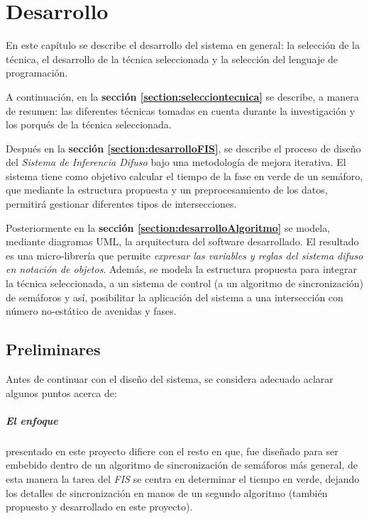 \chapter{Desarrollo}

En este capítulo se describe el desarrollo del sistema en general: la selección de la técnica, el desarrollo de la técnica seleccionada y la selección del lenguaje de programación.

A continuación, en la \textbf{sección \ref{section:selecciontecnica}} se describe, a manera de resumen: las diferentes técnicas tomadas en cuenta durante la investigación y los porqués de la técnica seleccionada.

Después en la \textbf{sección \ref{section:desarrolloFIS}}, se describe el proceso de diseño del \textit{Sistema de Inferencia Difuso} bajo una metodología de mejora iterativa. El sistema tiene como objetivo calcular el tiempo de la fase en verde de un semáforo, que mediante la estructura propuesta y un preprocesamiento de los datos, permitirá gestionar diferentes tipos de intersecciones.

Posteriormente en la \textbf{sección \ref{section:desarrolloAlgoritmo}} se modela, mediante diagramas UML, la arquitectura del software desarrollado. El resultado es una micro-librería que permite \emph{expresar las variables y reglas del sistema difuso en notación de objetos}. Además, se modela la estructura propuesta para integrar la técnica seleccionada, a un sistema de control (a un algoritmo de sincronización) de semáforos y así, posibilitar la aplicación del sistema a una intersección con número no-estático de avenidas y fases.

\section{Preliminares}
Antes de continuar con el diseño del sistema, se considera adecuado aclarar algunos puntos acerca de:

\paragraph{El enfoque} presentado en este proyecto difiere con el resto en que, fue diseñado para ser embebido dentro de un algoritmo de sincronización de semáforos más general, de esta manera la tarea del \textit{FIS} se centra en determinar el tiempo en verde, dejando los detalles de sincronización en manos de un segundo algoritmo (también propuesto y desarrollado en este proyecto).

